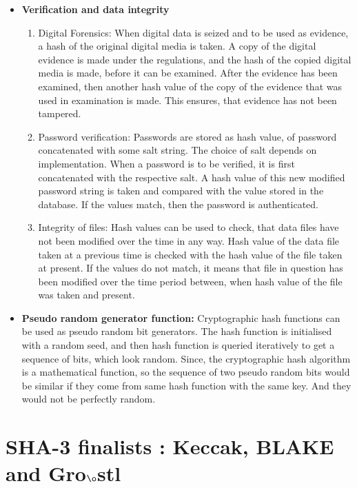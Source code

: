 \documentclass[12pt]{artikel3}                  %
\begin{document}
  \begin{itemize}
    \item {\bf Verification and data integrity}
      \begin{enumerate}

        \item Digital Forensics: When digital data is seized and to be used as evidence, a hash of the original
        digital media is taken. A copy of the digital evidence is made under the regulations, and the hash of the
        copied digital media is made, before it can be examined. After the evidence has been examined, then another
        hash value of the copy of the evidence that was used in examination is made. This ensures, that evidence
        has not been tampered.\cite{00013}

        \item Password verification: Passwords are stored as hash value, of password concatenated with some salt
        string. The choice of salt depends on implementation. When a password is to be verified, it is first 
        concatenated with the respective salt. A hash value of this new modified password string is taken and compared
        with the value stored in the database. If the values match, then the password is authenticated.

        \item Integrity of files: Hash values can be used to check, that data files have not been modified over the
        time in any way. Hash value of the data file taken at a previous time is checked with the hash value of the
        file taken at present. If the values do not match, it means that file in question has been modified over the
        time period between, when hash value of the file was taken and present.
      \end{enumerate}

    \item {\bf Pseudo random generator function:}
      Cryptographic hash functions can be used as pseudo random bit generators. The hash function is initialised
      with a random seed, and then hash function is queried iteratively to get a sequence of bits, which look random.
      Since, the cryptographic hash algorithm is a mathematical function, so the sequence of two pseudo random bits 
      would be similar if they come from same hash function with the same key. And they would not be perfectly random.
  \end{itemize}

\section{SHA-3 finalists : Keccak, BLAKE and Gro$\o$stl}
\end{document}
